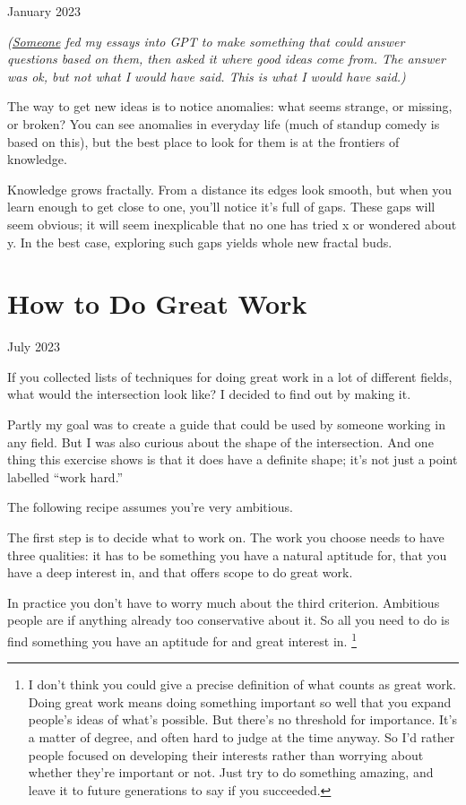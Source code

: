 \documentclass[12pt]{book}
\begin{document}
January 2023

\emph{(\href{https://twitter.com/stef/status/1617222428727586816}{Someone}
fed my essays into GPT to make something that could answer questions
based on them, then asked it where good ideas come from. The answer was
ok, but not what I would have said. This is what I would have said.)}

The way to get new ideas is to notice anomalies: what seems strange, or
missing, or broken? You can see anomalies in everyday life (much of
standup comedy is based on this), but the best place to look for them is
at the frontiers of knowledge.

Knowledge grows fractally. From a distance its edges look smooth, but
when you learn enough to get close to one, you'll notice it's full of
gaps. These gaps will seem obvious; it will seem inexplicable that no
one has tried x or wondered about y. In the best case, exploring such
gaps yields whole new fractal buds.
\chapter{How to Do Great Work}

July 2023

If you collected lists of techniques for doing great work in a lot of
different fields, what would the intersection look like? I decided to
find out by making it.

Partly my goal was to create a guide that could be used by someone
working in any field. But I was also curious about the shape of the
intersection. And one thing this exercise shows is that it does have a
definite shape; it's not just a point labelled ``work hard.''

The following recipe assumes you're very ambitious.

The first step is to decide what to work on. The work you choose needs
to have three qualities: it has to be something you have a natural
aptitude for, that you have a deep interest in, and that offers scope to
do great work.

In practice you don't have to worry much about the third criterion.
Ambitious people are if anything already too conservative about it. So
all you need to do is find something you have an aptitude for and great
interest in. \footnote{I don't think you could give a precise definition of what counts
as great work. Doing great work means doing something important so well
that you expand people's ideas of what's possible. But there's no
threshold for importance. It's a matter of degree, and often hard to
judge at the time anyway. So I'd rather people focused on developing
their interests rather than worrying about whether they're important or
not. Just try to do something amazing, and leave it to future
generations to say if you succeeded.}
\end{document}
